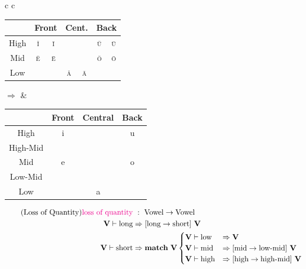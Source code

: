 \documentclass{report}[12pt]
\begin{document}
\begin{tcolorbox}
  \begin{tabular}{c c}
    \begin{tabular}{|c|c|c|c|c|c|c|}
      \hline
      & \multicolumn{2}{c|}{Front} & \multicolumn{2}{c|}{Cent.} & \multicolumn{2}{c|}{Back} \\
      \hline
      High & \cellcolor{gray} \textsc{\u{i}} & \textsc{\={i}} & & & \cellcolor{gray} \textsc{\u{u}} & \textsc{\={u}} \\
      \hline
      Mid & \cellcolor{gray} \textsc{\u{e}} & \textsc{\={e}} & & & \cellcolor{gray} \textsc{\u{o}} & \textsc{\={o}} \\
      \hline
      Low &  &  & \cellcolor{gray} \textsc{\u{a}} & \textsc{\={a}} & & \\
      \hline
    \end{tabular}
    \quad $\Rightarrow$ & 
                          \begin{tabular}{|c|c|c|c|}
                            \hline
                            & Front & Central & Back \\
                            \hline
                            High & i & & u \\
                            \hline
                            High-Mid & \cellcolor{magenta} \textipa{I} & & \cellcolor{magenta} \textipa{U} \\
                            \hline
                            Mid & e & & o \\
                            \hline
                            Low-Mid & \cellcolor{magenta} \textipa{E} & & \cellcolor{magenta} \textipa{O} \\
                            \hline
                            Low & & a & \\
                            \hline
                          \end{tabular}
  \end{tabular}
  \tcblower
  \begin{align*}\tag{Loss of Quantity}\label{eq:loss_of_quantity}
    \text{\textcolor{magenta}{loss of quantity}} &\ :\ \text{Vowel} \rightarrow \text{Vowel} \\
    \textbf{V} \vdash \text{long} & \Rightarrow [\text{long} \rightarrow \text{short}]\ \textbf{V} \\
    \textbf{V} \vdash \text{short} & \Rightarrow 
    \textbf{match}\ \textbf{V} \begin{cases}
                                \textbf{V} \vdash \text{low} & \Rightarrow \textbf{V} \\
                                \textbf{V} \vdash \text{mid} & \Rightarrow [\text{mid} \rightarrow \text{low-mid}]\ \textbf{V} \\
                                \textbf{V} \vdash \text{high} & \Rightarrow [\text{high} \rightarrow \text{high-mid}]\ \textbf{V} \\
                              \end{cases} \\
  \end{align*}
\end{tcolorbox}
\end{document}

